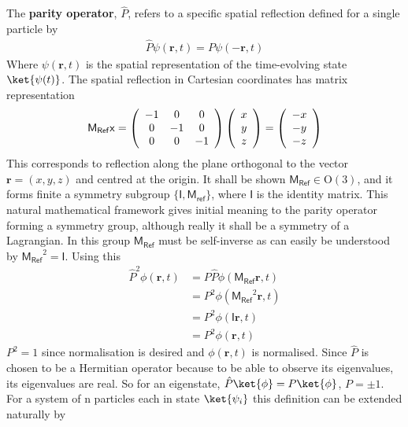 The \textbf{parity operator}, $\hat{P}$, refers to a specific spatial reflection defined for a single particle by
\begin{align*}
\hat{P}\psi(\mathbf{r},t) = P\psi(-\mathbf{r},t) 
\end{align*}
Where $\psi(\mathbf{r},t)$ is the spatial representation of the time-evolving state $\ket{\psi(t)}$. The spatial reflection in Cartesian coordinates has matrix representation
\begin{align*}
\mathsf{M_{Ref}}\mathsf{x}=\left( \begin{array}{c c c} -1 & 0 &0 \\
0& -1&0 \\
0&0&-1 \end{array}\right)\left( \begin{array}{c} x\\y\\z \end{array} \right) = \left( \begin{array}{c} -x\\-y\\-z \end{array} \right)
\end{align*}
This corresponds to reflection along the plane orthogonal to the vector $\mathbf{r}=(x,y,z)$ and centred at the origin. It shall be shown $\mathsf{M_{Ref}}  \in \mathrm{O}(3)$, and it forms finite a symmetry subgroup $\{\mathsf{I},\mathsf{M_{ref}} \}$, where $\mathsf{I}$ is the identity matrix. This natural mathematical framework gives initial meaning to the parity operator forming a symmetry group, although really it shall be a symmetry of a Lagrangian. In this group $\mathsf{M_{Ref}}$ must be self-inverse as can easily be understood by $\mathsf{M_{Ref}}^2=\mathsf{I}$. Using this
\begin{align*}
\hat{P}^2\phi(\mathbf{r},t)&=P\hat{P}\phi(\mathsf{M_{Ref}}\mathbf{r},t)\\
&= P^2\phi(\mathsf{M_{Ref}}^2\mathbf{r},t)\\
&= P^2\phi(\mathsf{I}\mathbf{r},t)\\
&= P^2\phi(\mathbf{r},t)
\end{align*}
$P^2=1$ since normalisation is desired and $\phi(\mathbf{r},t)$ is normalised. Since $\hat{P}$ is chosen to be a Hermitian operator because to be able to observe its eigenvalues, its eigenvalues are real. So for an eigenstate, $\hat{P}\ket{\phi}=P\ket{\phi}$, $P=\pm 1$. For a system of n particles each in state $\ket{\psi_i}$ this definition can be extended naturally by
